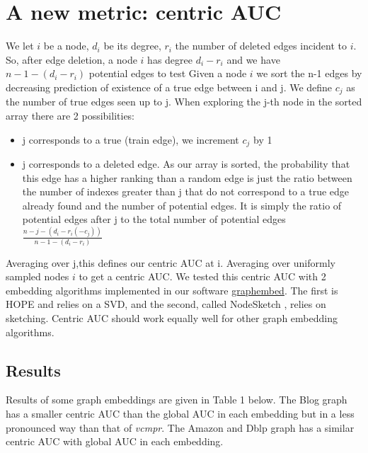 \documentclass{article}
\begin{document}
\section{A new metric: centric AUC}
We let $i$ be a node, $d_{i}$ be its degree, $r_{i}$ the number of deleted edges incident to $i$.
So, after edge deletion, a node $i$ has degree $d_{i} - r_{i}$ and we have  $ n - 1 - (d_{i} - r_{i})$  potential edges to test
Given a node $i$ we sort the n-1 edges by decreasing prediction of existence of a true edge between i and j.
We define $c_{j}$  as the number of true edges seen up to j.
When exploring the j-th node in the sorted array there are 2 possibilities:
\begin{itemize}
    \item j corresponds to a true (train edge), we increment $c_{j}$ by 1
    \item j corresponds to a deleted edge. As our array is sorted, the probability that this edge has a higher
          ranking than a random edge is just the ratio between the number of indexes greater than j that do not correspond
          to a true edge already found and the number of potential edges. It is simply the ratio of potential edges after j to
          the total number of potential edges $ \frac{n-j-(d_{i}-r_{i}(-c_{j}))}{n-1-(d_{i}-r_{i})}$
\end{itemize}
Averaging over j,this defines our centric AUC at i.  Averaging over uniformly sampled nodes $i$ to get a centric AUC.
We tested this centric AUC with 2 embedding algorithms implemented in our software \href{https://github.com/jean-pierreBoth/graphembed}{\color{blue}graphembed}.
The first is HOPE \citep{Cui} and relies on a SVD, and the second, called NodeSketch \citep{Yang}, relies on sketching. Centric AUC should work equally well for other graph embedding algorithms.

\subsection{Results}

Results of some graph embeddings are given in Table 1 below. The Blog graph has a smaller centric AUC than the global AUC in each embedding but in a less pronounced way than that of \textit{vcmpr}. The Amazon and Dblp graph has a similar centric AUC with global AUC in each embedding.
\end{document}
